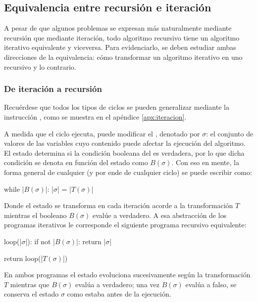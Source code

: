\subsection{Equivalencia entre recursión e iteración}
\label{sec:recursion_iteracion}

A pesar de que algunos problemas se expresan más naturalmente mediante recursión que mediante iteración, todo algoritmo recursivo tiene un algoritmo iterativo equivalente y viceversa. Para evidenciarlo, se deben estudiar ambas direcciones de la equivalencia: cómo transformar un algoritmo iterativo en uno recursivo y lo contrario.

\subsubsection{De iteración a recursión}

Recuérdese que todos los tipos de ciclos se pueden generalizar mediante la instrucción , como se muestra en el apéndice \ref{apx:iteracion}.

A medida que el ciclo  ejecuta, puede modificar el , denotado por \(\sigma\): el conjunto de valores de las variables cuyo contenido puede afectar la ejecución del algoritmo. El estado determina si la condición booleana del  es verdadera, por lo que dicha condición se denota en función del estado como \(B(\sigma)\). Con eso en mente, la forma general de cualquier  (y por ende de cualquier ciclo) se puede escribir como:
\begin{codeblock}
\begin{pseudocode}
while |\(B(\sigma)\)|:
    |\(\sigma\)| = |\(T(\sigma)\)|
\end{pseudocode}
\end{codeblock}
Donde el estado se transforma en cada iteración acorde a la transformación \(T\) mientras el booleano \(B(\sigma)\) evalúe a verdadero. A esa abstracción de los programas iterativos le corresponde el siguiente programa recursivo equivalente:
\begin{codeblock}
\begin{pseudocode}
loop(|\(\sigma\)|):
    if not |\(B(\sigma)\)|:
        return |\(\sigma\)|

    return loop(|\(T(\sigma)\)|)
\end{pseudocode}
\end{codeblock}
En ambos programas el estado evoluciona sucesivamente según la transformación \(T\) mientras que \(B(\sigma)\) evalúa a verdadero; una vez \(B(\sigma)\) evalúa a falso, se conserva el estado \(\sigma\) como estaba antes de la ejecución.

